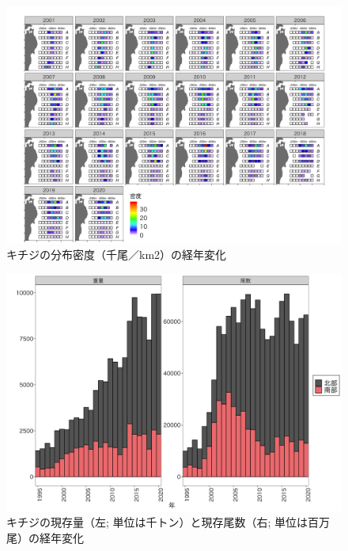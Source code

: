 \documentclass[11pt]{article} %
\begin{document}
\begin{linenumbers}
\begin{figure}[h]
  \centering
  \includegraphics[width = 14cm]{キチジdens.png}
  \caption{キチジの分布密度（千尾／km2）の経年変化}
\end{figure}

\begin{figure}[h]
  \centering
  \includegraphics[width = 14cm]{キチジtrend.png}
  \caption{キチジの現存量（左; 単位は千トン）と現存尾数（右; 単位は百万尾）の経年変化}
\end{figure}


\end{linenumbers}
\end{document}
